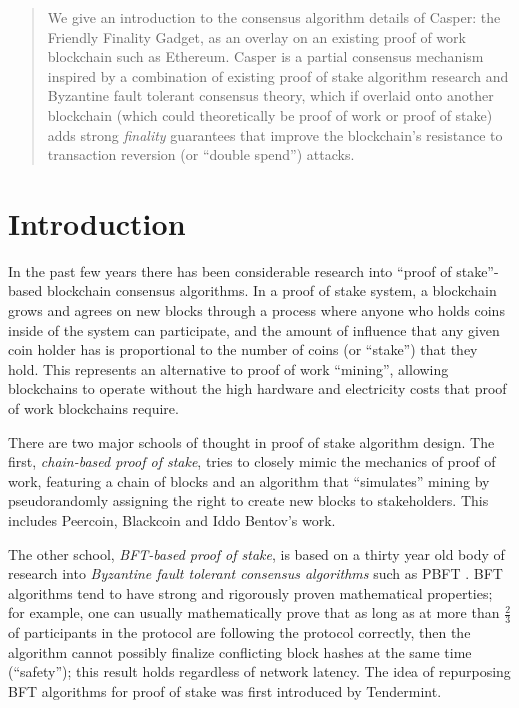 \documentclass[12pt, final]{article}
\begin{document}
\maketitle

\begin{abstract}
We give an introduction to the consensus algorithm details of Casper: the Friendly Finality Gadget, as an overlay on an existing proof of work blockchain such as Ethereum. Casper is a partial consensus mechanism inspired by a combination of existing proof of stake algorithm research and Byzantine fault tolerant consensus theory, which if overlaid onto another blockchain (which could theoretically be proof of work or proof of stake) adds strong \textit{finality} guarantees that improve the blockchain's resistance to transaction reversion (or ``double spend'') attacks.
\end{abstract}

\section{Introduction}
\label{sect:intro}

In the past few years there has been considerable research into ``proof of stake''-based blockchain consensus algorithms. In a proof of stake system, a blockchain grows and agrees on new blocks through a process where anyone who holds coins inside of the system can participate, and the amount of influence that any given coin holder has is proportional to the number of coins (or ``stake'') that they hold. This represents an alternative to proof of work ``mining'', allowing blockchains to operate without the high hardware and electricity costs that proof of work blockchains require.

There are two major schools of thought in proof of stake algorithm design. The first, \textit{chain-based proof of stake}, tries to closely mimic the mechanics of proof of work, featuring a chain of blocks and an algorithm that ``simulates'' mining by pseudorandomly assigning the right to create new blocks to stakeholders. This includes Peercoin\cite{king2012ppcoin}, Blackcoin\cite{vasin2014blackcoin} and Iddo Bentov's work\cite{bentov2016pos}.

The other school, \textit{BFT-based proof of stake}, is based on a thirty year old body of research into \textit{Byzantine fault tolerant consensus algorithms} such as PBFT \cite{castro1999practical}. BFT algorithms tend to have strong and rigorously proven mathematical properties; for example, one can usually mathematically prove that as long as at more than $\frac{2}{3}$ of participants in the protocol are following the protocol correctly, then the algorithm cannot possibly finalize conflicting block hashes at the same time (``safety''); this result holds regardless of network latency. The idea of repurposing BFT algorithms for proof of stake was first introduced by Tendermint\cite{kwon2014tendermint}.
\end{document}
